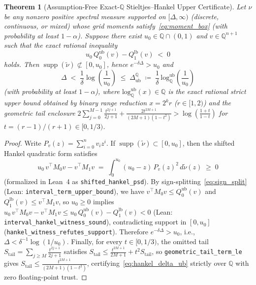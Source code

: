 \documentclass[11pt,a4paper]{article}
\newtheorem{theorem}{Theorem}[section]
\theoremstyle{definition}
\newcommand{\Q}{\mathbb{Q}}
\begin{document}
\begin{theorem}[Assumption-Free Exact-$\Q$ Stieltjes--Hankel Upper Certificate]
\label{thm:hankel_cert}
Let $\nu$ be \emph{any} nonzero positive spectral measure supported on $[\Delta, \infty)$ (discrete, continuous, or mixed) whose grid moments satisfy~\eqref{eq:moment_box} (with probability at least $1-\alpha$). Suppose there exist $u_0 \in \Q \cap (0, 1)$ and $v \in \Q^{n+1}$ such that the exact rational inequality
\begin{equation}
  u_0\, Q_0^{\mathrm{ub}}(v) - Q_1^{\mathrm{lb}}(v) \;<\; 0
  \label{eq:hankel_witness}
\end{equation}
holds. Then $\operatorname{supp}(\tilde{\nu}) \not\subset [0, u_0]$, hence $e^{-\delta \Delta} > u_0$ and
\begin{equation}
  \Delta \;<\; \frac{1}{\delta}\log\!\left(\frac{1}{u_0}\right) \;\le\; \Delta_{\mathrm{ub}}^{\Q}
  \;\coloneqq\; \frac{1}{\delta}\,\mathrm{log}_{\Q}^{\mathrm{ub}}\!\left(\frac{1}{u_0}\right)
  \label{eq:hankel_delta_ub}
\end{equation}
(with probability at least $1-\alpha$), where $\mathrm{log}_{\Q}^{\mathrm{ub}}(x) \in \Q$ is the exact rational strict upper bound obtained by binary range reduction $x = 2^k r$ ($r \in [1,2)$) and the geometric tail enclosure $2\sum_{j=0}^{M-1}\frac{t^{2j+1}}{2j+1} + \frac{2 t^{2M+1}}{(2M+1)(1-t^2)} > \log(\frac{1+t}{1-t})$ for $t = (r-1)/(r+1) \in [0, 1/3)$.
\end{theorem}

\begin{proof}
Write $P_v(z) = \sum_{i=0}^n v_i z^i$. If $\operatorname{supp}(\tilde{\nu}) \subset [0, u_0]$, then the shifted Hankel quadratic form satisfies
\[
  u_0\, v^\top M_0 v - v^\top M_1 v
  \;=\; \int_0^{u_0} (u_0 - z)\, P_v(z)^2\, d\tilde{\nu}(z) \;\ge\; 0
\]
(formalized in Lean~4 as \texttt{shifted\_hankel\_psd}). By sign-splitting~\eqref{eq:sign_split} (Lean: \texttt{interval\_term\_}\allowbreak\texttt{upper\_bound}), we have $v^\top M_0 v \le Q_0^{\mathrm{ub}}(v)$ and $Q_1^{\mathrm{lb}}(v) \le v^\top M_1 v$, so $u_0 \ge 0$ implies $u_0\, v^\top M_0 v - v^\top M_1 v \le u_0\, Q_0^{\mathrm{ub}}(v) - Q_1^{\mathrm{lb}}(v) < 0$ (Lean: \texttt{interval\_hankel\_}\allowbreak\texttt{witness\_sound}), contradicting support in $[0, u_0]$ (\texttt{hankel\_witness\_}\allowbreak\texttt{refutes\_support}). Therefore $e^{-\delta\Delta} > u_0$, i.e., $\Delta < \delta^{-1}\log(1/u_0)$. Finally, for every $t \in [0, 1/3)$, the omitted tail $S_{\mathrm{tail}} = \sum_{j \ge M} \frac{t^{2j+1}}{2j+1}$ satisfies $S_{\mathrm{tail}} \le \frac{t^{2M+1}}{2M+1} + t^2 S_{\mathrm{tail}}$, so \texttt{geometric\_tail\_}\allowbreak\texttt{term\_le} gives $S_{\mathrm{tail}} \le \frac{t^{2M+1}}{(2M+1)(1-t^2)}$, certifying~\eqref{eq:hankel_delta_ub} strictly over $\Q$ with zero floating-point trust.
\end{proof}
\end{document}
